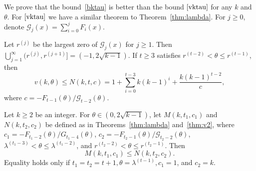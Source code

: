 \documentclass[ALCO,ThmDefs,Unicode,epreuves]{cedram}
\begin{document}
We prove that the bound~\eqref{bktau} is better than the bound $\eqref{vktau}$ for any $k$ and $\theta$. For $\eqref{vktau}$ we have a similar theorem to Theorem~\ref{thm:lambda}. For $j\geq 0$, denote $\mathcal{G}_j(x)=\sum_{i=0}^j F_i(x)$. 
\begin{theo} \label{thm:v2}
Let $r^{(j)}$ be the largest zero of $\mathcal{G}_j(x)$ for $j\geq 1$. Then $\bigcup_{j= 1 }^\infty (r^{(j)},r^{(j+1)}]= (-1,2 \sqrt{k-1})$. If $t\geq 3$ satisfies $r^{(t-2)} < \theta \leq r^{(t-1)}$, then 
\[
v(k,\theta) \leq N(k,t,c)=1+\sum_{i=0}^{t-3}k (k-1)^{i}+\frac{k(k-1)^{t-2}}{c}, 
\] 
where $c=-F_{t-1}(\theta)/\mathcal{G}_{t-2}(\theta)$. 
\end{theo} 

\begin{theo}
Let $k \geq 2$ be an integer. For $\theta \in (0,2 \sqrt{k-1})$, let $M(k,t_1,c_1)$ and $N(k,t_2,c_2)$ be defined as in Theorems~\ref{thm:lambda} and~\ref{thm:v2}, where $c_1=-F_{t_1-2}(\theta)/G_{t_1-4}(\theta)$, $c_2=-F_{t_2-1}(\theta)/\mathcal{G}_{t_2-2}(\theta)$, $\lambda^{(t_1-3)}<\theta \leq \lambda^{(t_1-2)}$, and $r^{(t_2-2)}<\theta \leq r^{(t_2-1)}$. Then 
\begin{equation*}
M(k,t_1,c_1) \leq N(k,t_2,c_2).
\end{equation*} 
Equality holds only if $t_1=t_2=t+1, \theta=\lambda^{(t-1)}, c_1=1$, and $c_2=k$. 
\end{theo}
\end{document}
